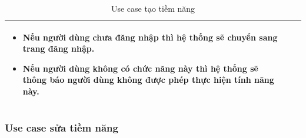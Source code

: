\documentclass[12pt,a4paper]{article}
\begin{document}
\begin{table}[H]
\begin{tabular}{|p{3.5cm}|p{11.5cm}|c|}
            \vspace{-.8cm}\begin{itemize}
                              \item Nếu người dùng chưa đăng nhập thì hệ thống sẽ chuyển sang trang đăng nhập.
                              \item  Nếu người dùng không có chức năng này thì hệ thống sẽ thông báo người dùng không được phép thực hiện tính năng này.
            \end{itemize}
            \\
            \hline
        \end{tabular}
        \caption{Use case tạo tiềm năng}
    \end{table}


    \subsubsection*{Use case sửa tiềm năng }
\end{document}

